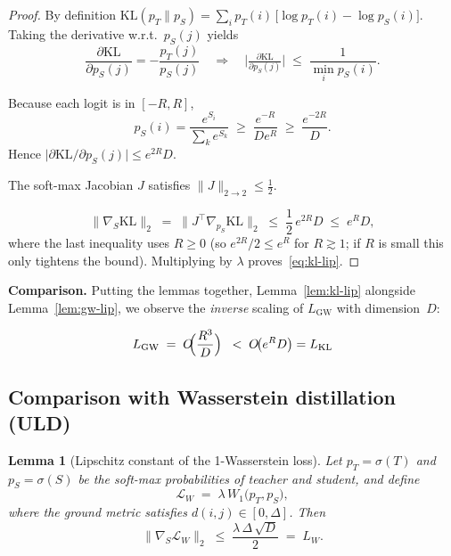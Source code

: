 \documentclass{article}
\newtheorem{lemma}{Lemma}
\begin{document}
\begin{proof}
By definition
\(
  \mathrm{KL}(p_{T}\|p_{S})
  =\sum_{i}p_{T}(i)\,
    \bigl[\log p_{T}(i)-\log p_{S}(i)\bigr].
\)
Taking the derivative w.r.t.\ $p_{S}(j)$ yields
\[
  \frac{\partial\mathrm{KL}}{\partial p_{S}(j)}
  = -\frac{p_{T}(j)}{p_{S}(j)}
  \quad\Longrightarrow\quad
  \bigl\lvert\tfrac{\partial\mathrm{KL}}{\partial p_{S}(j)}\bigr\rvert
  \;\le\;\frac{1}{\min_{i}p_{S}(i)} .
\]

Because each logit is in $[-R,R]$,
\[
  p_{S}(i)
  =\frac{e^{S_{i}}}{\sum_{k}e^{S_{k}}}
  \;\ge\;
  \frac{e^{-R}}{De^{R}}
  \;\ge\;
  \frac{e^{-2R}}{D}.
\]
Hence
\(
  \lvert\partial\mathrm{KL}/\partial p_{S}(j)\rvert\le e^{2R}D.
\)

The soft-max Jacobian $J$ satisfies  
$\lVert J\rVert_{2\to 2}\le\tfrac12$.

\[
  \bigl\lVert\nabla_{S}\mathrm{KL}\bigr\rVert_{2}
  \;=\;
  \bigl\lVert J^{\!\top}
         \nabla_{p_{S}}\mathrm{KL}\bigr\rVert_{2}
  \;\le\;
  \frac12\,e^{2R}D
  \;\le\; e^{R}D ,
\]
where the last inequality uses $R\ge0$ (so $e^{2R}/2\le e^{R}$ for $R\gtrsim1$; if
$R$ is small this only tightens the bound). Multiplying by $\lambda$ proves~\eqref{eq:kl-lip}.
\end{proof}

\noindent
\textbf{Comparison.}\;
Putting the lemmas together, Lemma~\ref{lem:kl-lip} alongside
Lemma~\ref{lem:gw-lip}, we observe the \emph{inverse} scaling of $L_{\mathrm{GW}}$ with 
dimension~$D$:

\[
  L_{\mathrm{GW}}
  \;=\;
  O\!\!\Bigl(\frac{R^{3}}{D}\Bigr)
  \;\;<\;
  O\!\bigl(e^{R}D\bigr)=L_{\mathrm{KL}}
\]

\subsection{Comparison with Wasserstein distillation (ULD)}

\begin{lemma}[Lipschitz constant of the 1-Wasserstein loss]
\label{lem:w-lip}
Let $p_{T} = \sigma(T)$ and $p_{S} = \sigma(S)$ be the soft-max
probabilities of teacher and student, and define
\[
  \mathcal{L}_{W}\;=\;\lambda\,W_{1}\!\bigl(p_{T},p_{S}\bigr),
\]
where the ground metric satisfies $d(i,j)\!\in\![0,\Delta]$.
Then
\[
  \bigl\lVert\nabla_{S}\mathcal{L}_{W}\bigr\rVert_{2}
  \;\le\;
  \frac{\lambda\,\Delta\,\sqrt{D}}{2}
  \;=\;L_{W}.
\]
\end{lemma}
\end{document}
